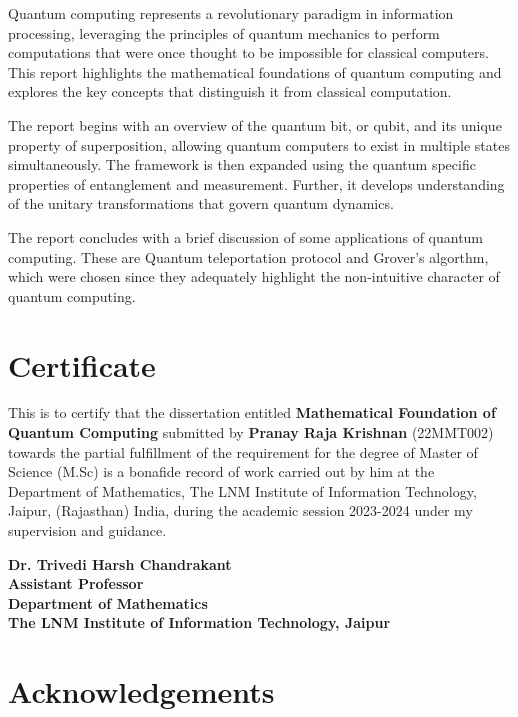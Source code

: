 \documentclass[12pt,twoside,fleqn]{report}
\theoremstyle{thmstyle}
\begin{document}
Quantum computing represents a revolutionary paradigm in information processing, leveraging the principles of quantum mechanics to perform computations that were once thought to be impossible for classical computers. This report highlights the mathematical foundations of quantum computing and explores the key concepts that distinguish it from classical computation.

The report begins with an overview of the quantum bit, or qubit, and its unique property of superposition, allowing quantum computers to exist in multiple states simultaneously. The framework is then expanded using the quantum specific properties of entanglement and measurement. Further, it develops understanding of the unitary transformations that govern quantum dynamics.

The report concludes with a brief discussion of some applications of quantum computing. These are Quantum teleportation protocol and Grover's algorthm, which were chosen since they adequately highlight the non-intuitive character of quantum computing. 

\renewcommand{\sectionmark}[1]{\markright{#1}}

\chapter*{Certificate}

This is to certify that the dissertation entitled \textbf{Mathematical Foundation of Quantum Computing} submitted by \textbf{Pranay Raja Krishnan} (22MMT002) towards the partial fulfillment of the requirement for the degree of Master of Science (M.Sc) is a bonafide record of work carried out by him at the Department of Mathematics, The LNM Institute of Information Technology, Jaipur, (Rajasthan) India, during the academic session 2023-2024 under my supervision and guidance. \\
\vspace*{3cm}
\begin{flushright}
	\hfill
	{\parbox{7cm}{\textbf{Dr. Trivedi Harsh Chandrakant\\
	Assistant Professor\\
	Department of Mathematics\\
	The LNM Institute of Information Technology, Jaipur}}}
\end{flushright}

\chapter*{Acknowledgements}
\end{document}
